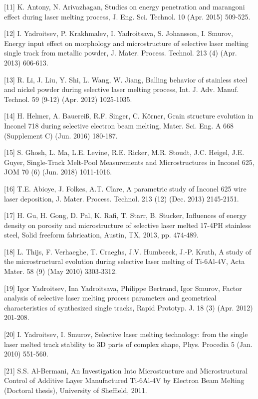 \documentclass[10pt]{article}
\begin{document}
[11] K. Antony, N. Arivazhagan, Studies on energy penetration and marangoni effect during laser melting process, J. Eng. Sci. Technol. 10 (Apr. 2015) 509-525.

[12] I. Yadroitsev, P. Krakhmalev, I. Yadroitsava, S. Johansson, I. Smurov, Energy input effect on morphology and microstructure of selective laser melting single track from metallic powder, J. Mater. Process. Technol. 213 (4) (Apr. 2013) 606-613.

[13] R. Li, J. Liu, Y. Shi, L. Wang, W. Jiang, Balling behavior of stainless steel and nickel powder during selective laser melting process, Int. J. Adv. Manuf. Technol. 59 (9-12) (Apr. 2012) 1025-1035.

[14] H. Helmer, A. Bauereiß, R.F. Singer, C. Körner, Grain structure evolution in Inconel 718 during selective electron beam melting, Mater. Sci. Eng. A 668 (Supplement C) (Jun. 2016) 180-187.

[15] S. Ghosh, L. Ma, L.E. Levine, R.E. Ricker, M.R. Stoudt, J.C. Heigel, J.E. Guyer, Single-Track Melt-Pool Measurements and Microstructures in Inconel 625, JOM 70 (6) (Jun. 2018) 1011-1016.

[16] T.E. Abioye, J. Folkes, A.T. Clare, A parametric study of Inconel 625 wire laser deposition, J. Mater. Process. Technol. 213 (12) (Dec. 2013) 2145-2151.

[17] H. Gu, H. Gong, D. Pal, K. Rafi, T. Starr, B. Stucker, Influences of energy density on porosity and microstructure of selective laser melted 17-4PH stainless steel, Solid freeform fabrication, Austin, TX, 2013, pp. 474-489.

[18] L. Thijs, F. Verhaeghe, T. Craeghs, J.V. Humbeeck, J.-P. Kruth, A study of the microstructural evolution during selective laser melting of Ti-6Al-4V, Acta Mater. 58 (9) (May 2010) 3303-3312.

[19] Igor Yadroitsev, Ina Yadroitsava, Philippe Bertrand, Igor Smurov, Factor analysis of selective laser melting process parameters and geometrical characteristics of synthesized single tracks, Rapid Prototyp. J. 18 (3) (Apr. 2012) 201-208.

[20] I. Yadroitsev, I. Smurov, Selective laser melting technology: from the single laser melted track stability to 3D parts of complex shape, Phys. Procedia 5 (Jan. 2010) 551-560.

[21] S.S. Al-Bermani, An Investigation Into Microstructure and Microstructural Control of Additive Layer Manufactured Ti-6Al-4V by Electron Beam Melting (Doctoral thesis), University of Sheffield, 2011.
\end{document}
